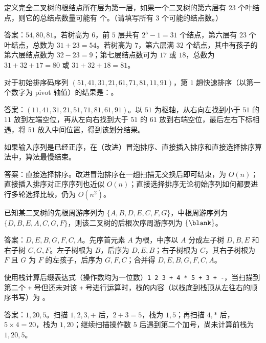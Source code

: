 \begin{question}
定义完全二叉树的根结点所在层为第一层，如果一个二叉树的第六层有 $23$ 个叶结点，则它的总结点数量可能有 \blank 个。（请填写所有 $3$ 个可能的结点数。）
\begin{solution}
答案：$54,80,81$。若树高为 $6$，前 $5$ 层共有 $2^5-1=31$ 个结点，第六层有 $23$ 个叶结点，总数为 $31+23=54$。若树高为 $7$，第六层满 $32$ 个结点，其中有孩子的第六层结点数为 $32-23=9$；第七层结点数可为 $17$ 或 $18$，总数为 $31+32+17=80$ 或 $31+32+18=81$。
\end{solution}
\end{question}

\begin{question}
对于初始排序码序列 $(51,41,31,21,61,71,81,11,91)$，第 $1$ 趟快速排序（以第一个数字为 pivot 轴值）的结果是：\blank。
\begin{solution}
答案：$(11,41,31,21,51,71,81,61,91)$。以 $51$ 为枢轴，从右向左找到小于 $51$ 的 $11$ 放到左端空位，再从左向右找到大于 $51$ 的 $61$ 放到右端空位，最后左右下标相遇，将 $51$ 放入中间位置，得到该划分结果。
\end{solution}
\end{question}

\begin{question}
如果输入序列是已经正序，在（改进）冒泡排序、直接插入排序和直接选择排序算法中，\blank 算法最慢结束。
\begin{solution}
答案：直接选择排序。改进冒泡排序在一趟扫描无交换后即可结束，为 $O(n)$；直接插入排序对正序序列也近似 $O(n)$；直接选择排序无论初始序列如何都要进行多轮选择比较，仍为 $O(n^2)$。
\end{solution}
\end{question}

\begin{question}
已知某二叉树的先根周游序列为 $\{A,B,D,E,C,F,G\}$，中根周游序列为 $\{D,B,E,A,C,G,F\}$，则该二叉树的后根次序周游序列为 $\{\blank\}$。
\begin{solution}
答案：$D,E,B,G,F,C,A$。先序首元素 $A$ 为根，中序以 $A$ 分成左子树 $D,B,E$ 和右子树 $C,G,F$。左子树根为 $B$，后序为 $D,E,B$；右子树根为 $C$，其右子树根为 $F$ 且 $G$ 为 $F$ 的左孩子，后序为 $G,F,C$；合并得 $D,E,B,G,F,C,A$。
\end{solution}
\end{question}

\begin{question}
使用栈计算后缀表达式（操作数均为一位数）\texttt{1 2 3 + 4 * 5 + 3 + -}，当扫描到第二个 \texttt{+} 号但还未对该 \texttt{+} 号进行运算时，栈的内容（以栈底到栈顶从左往右的顺序书写）为 \blank。
\begin{solution}
答案：$1,20,5$。扫描 $1,2,3,+$ 后，$2+3=5$，栈为 $1,5$；再扫描 $4,*$ 后，$5\times4=20$，栈为 $1,20$；继续扫描操作数 $5$ 后遇到第二个加号，尚未计算前栈为 $1,20,5$。
\end{solution}
\end{question}

